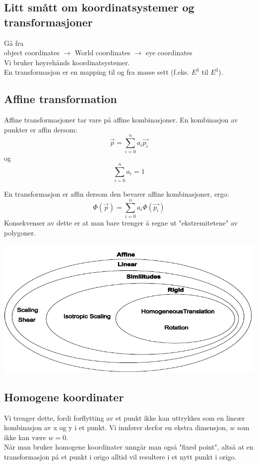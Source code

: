 \subsection{Litt smått om koordinatsystemer og transformasjoner}
Gå fra 
\\ object coordinates $\rightarrow$ World coordinates $\rightarrow$ eye coordinates \\
Vi bruker høyrehånds koordinatsystemer. \\
En transformasjon er en mapping til og fra masse sett (f.eks. $E^3$ til $E^3$).

\subsection{Affine transformation}
Affine transformasjoner tar vare på affine kombinasjoner.
En kombinasjon av punkter er affin dersom:
\begin{equation}
    \vec{p} = \sum_{i=0}^n a_i \vec{p_i}
\end{equation}
og
\begin{equation}
    \sum_{i=0}^n a_i = 1
\end{equation}

En transformasjon er affin dersom den bevarer affine kombinasjoner, ergo:
\begin{equation}
    \Phi (\vec{p}) = \sum_{i=0}^n a_i \Phi (\vec{p_i})
\end{equation}
Konsekvenser av dette er at man bare trenger å regne ut "ekstremitetene" av polygoner.

\includegraphics[width=\textwidth]{Bilder/Affine.PNG}

\subsection{Homogene koordinater}
Vi trenger dette, fordi forflytting av et punkt ikke kan uttrykkes som en lineær kombinasjon av x og y i et punkt. Vi innfører derfor en ekstra dimensjon, $w$ som ikke kan være $w=0$. \\
Når man bruker homogene koordinater unngår man også "fixed point", altså at en transformasjon på et punkt i origo alltid vil resultere i et nytt punkt i origo.

